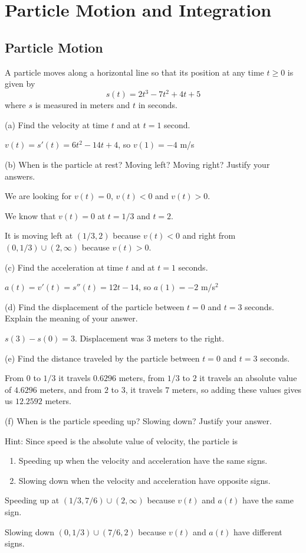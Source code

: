 \documentclass[../bccalc.tex]{subfiles}
\begin{document}
\chapter{Particle Motion and Integration}
\section{Particle Motion}
\begin{example}
    A particle moves along a horizontal line so that its position at any time $t\geq 0$ is given by \[ s(t)=2t^3-7t^2+4t+5 \] where $s$ is measured in meters and $t$ in seconds.

    (a) Find the velocity at time $t$ and at $t=1$ second.

    $v(t)=s'(t)=6t^2-14t+4$, so $v(1)=-4$ m/s

    (b) When is the particle at rest? Moving left? Moving right? Justify your answers.

    We are looking for $v(t)=0$, $v(t)<0$ and $v(t)>0$.

    We know that $v(t)=0$ at $t=1/3$ and $t=2$.

    It is moving left at $(1/3,2)$ because $v(t)<0$ and right from $(0,1/3)\cup (2,\infty)$ because $v(t)>0$.

    (c) Find the acceleration at time $t$ and at $t=1$ seconds.

    $a(t)=v'(t)=s''(t)=12t-14$, so $a(1)=-2$ m/s$^2$

    (d) Find the displacement of the particle between $t=0$ and $t=3$ seconds. Explain the meaning of your answer.

    $s(3)-s(0)=3$. Displacement was 3 meters to the right.

    (e) Find the distance traveled by the particle between $t=0$ and $t=3$ seconds.

    From $0$ to $1/3$ it travels $0.6296$ meters, from $1/3$ to $2$ it travels an absolute value of $4.6296$ meters, and from $2$ to $3$, it travels $7$ meters, so adding these values gives us $12.2592$ meters.

    (f) When is the particle speeding up? Slowing down? Justify your answer.

    Hint: Since speed is the absolute value of velocity, the particle is 
    \begin{enumerate}
        \item Speeding up when the velocity and acceleration have the same signs.
        \item Slowing down when the velocity and acceleration have opposite signs.
    \end{enumerate}

    Speeding up at $(1/3,7/6)\cup (2,\infty)$ because $v(t)$ and $a(t)$ have the same sign.

    Slowing down $(0,1/3)\cup (7/6,2)$ because $v(t)$ and $a(t)$ have different signs.
\end{example}
\end{document}
